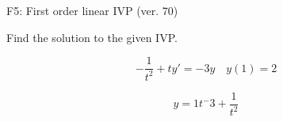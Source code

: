 \begin{exercise}
  \begin{exerciseTitle}F5: First order linear IVP (ver. 70)\end{exerciseTitle}
  \begin{exerciseStatement}
    
Find the solution to the given IVP.

    
\[-\frac{1}{t^{2}} +ty'= -3 y \hspace{1em} y( 1 ) = 2\]

  \end{exerciseStatement}
  \begin{exerciseAnswer}
    
\[y= 1 t^ -3 + \frac{1}{t^{2}}\]

  \end{exerciseAnswer}
\end{exercise}